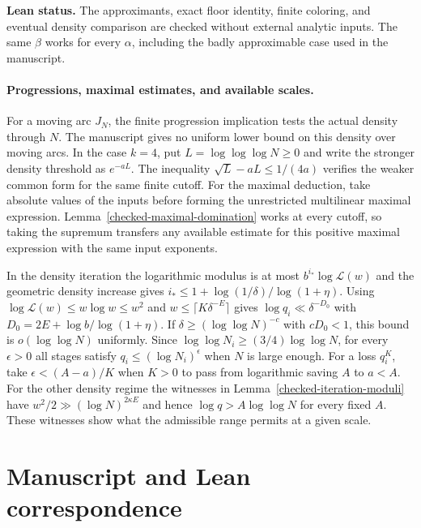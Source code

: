 \noindent\textbf{Lean status.} The approximants, exact floor
identity, finite coloring, and eventual density comparison are checked
without external analytic inputs. The same $\beta$ works for every
$\alpha$, including the badly approximable case used in the manuscript.

\paragraph{Progressions, maximal estimates, and available scales.}
For a moving arc $J_N$, the finite progression implication tests
the actual density through $N$. The manuscript gives no uniform
lower bound on this density over moving arcs. In the case $k=4$,
put $L=\log\log\log N\ge0$ and write the stronger density threshold
as $e^{-aL}$. The inequality $\sqrt L-aL\le1/(4a)$ verifies
the weaker common form for the same finite cutoff.
For the maximal deduction, take absolute values of the inputs
before forming the unrestricted multilinear maximal expression.
Lemma~\ref{checked-maximal-domination} works at every cutoff,
so taking the supremum transfers any available estimate for
this positive maximal expression with the same input exponents.

In the density iteration the logarithmic modulus is at most
$b^{i_*}\log\mathcal L(w)$ and the geometric density increase gives
$i_*\le1+\log(1/\delta)/\log(1+\eta)$.
Using $\log\mathcal L(w)\le w\log w\le w^2$ and
$w\le\lceil K\delta^{-E}\rceil$ gives
$\log q_i\ll\delta^{-D_0}$ with $D_0=2E+\log b/\log(1+\eta)$.
If $\delta\ge(\log\log N)^{-c}$ with $cD_0<1$, this bound is
$o(\log\log N)$ uniformly. Since
$\log\log N_i\ge(3/4)\log\log N$, for every $\epsilon>0$ all stages
satisfy $q_i\le(\log N_i)^\epsilon$ when $N$ is large enough.
For a loss $q_i^K$, take $\epsilon<(A-a)/K$ when $K>0$ to pass
from logarithmic saving $A$ to $a<A$. For the other density regime
the witnesses in Lemma~\ref{checked-iteration-moduli} have
$w^2/2\gg(\log N)^{2\kappa E}$ and hence
$\log q>A\log\log N$ for every fixed $A$. These witnesses show
what the admissible range permits at a given scale.

\section{Manuscript and Lean correspondence}
\printmapping

